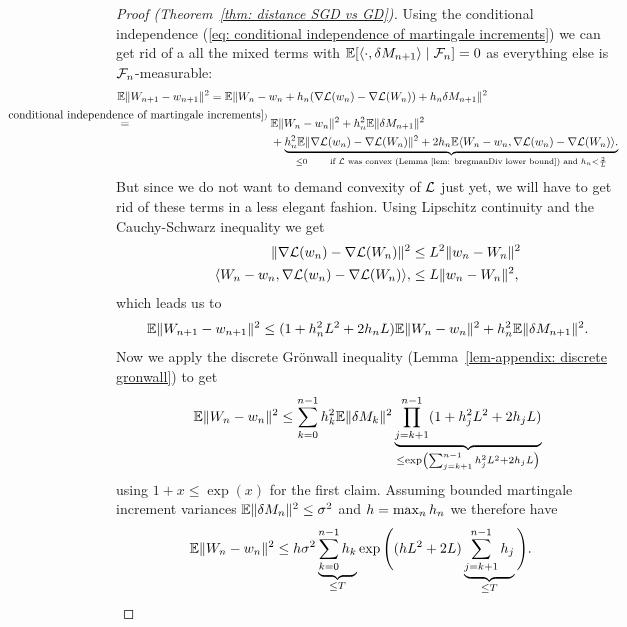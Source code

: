 \begin{proof}[Proof (Theorem~\ref{thm: distance SGD vs GD})]
	Using the conditional independence (\ref{eq: conditional independence of martingale increments})
	we can get rid of a all the mixed terms with
	\(\mathbb{E}[\langle \cdot, \delta M_{n+1}\rangle\mid\mathcal{F}_n]=0\) as everything
	else is \(\mathcal{F}_n\)-measurable:
	\begin{align*}
		&\E\|\Weights_{n+1}-\weights_{n+1}\|^2
		= \E\|\Weights_n - \weights_n
		+ \lr_n(\nabla\Loss(\weights_n)-\nabla\Loss(\Weights_n))
		+ \lr_n\martIncr_{n+1}\|^2\\
		&\lxeq{(\ref{eq: conditional independence of martingale increments})}
		\begin{aligned}[t]
			&\E\|\Weights_n-\weights_n\|^2 + \lr_n^2\E\|\martIncr_{n+1}\|^2\\
			&+\underbrace{
				\lr_n^2\E\|\nabla\Loss(\weights_n)-\nabla\Loss(\Weights_n)\|^2
				+ 2\lr_n\E\langle\Weights_n-\weights_n,
				\nabla\Loss(\weights_n)-\nabla\Loss(\Weights_n)\rangle.
			}_{
				\le 0 \qquad
				\text{if \(\Loss\) was convex (Lemma~\ref{lem: bregmanDiv lower bound}) and }
				\lr_n<\frac2\ubound
			}
		\end{aligned}
	\end{align*}
	But since we do not want to demand convexity of \(\mathcal{L}\) just yet, we will
	have to get rid of these terms in a less elegant fashion. Using Lipschitz
	continuity and the Cauchy-Schwarz inequality we get
	\begin{align*}
		\|\nabla\mathcal{L}(w_n)-\nabla\mathcal{L}(W_n)\|^2
		&\le L^2\|w_n-W_n\|^2\\
		\langle W_n-w_n,
		\nabla\mathcal{L}(w_n)-\nabla\mathcal{L}(W_n)\rangle,
		&\le L \|w_n-W_n\|^2,
	\end{align*}
	which leads us to
	\begin{align*}
		\mathbb{E}\|W_{n+1}-w_{n+1}\|^2
		\le (1+h_n^2L^2 + 2h_nL)\mathbb{E}\|W_n-w_n\|^2
		+ h_n^2\mathbb{E}\|\delta M_{n+1}\|^2.
	\end{align*}
	Now we apply the discrete Gr\"onwall inequality (Lemma~\ref{lem-appendix:
	discrete gronwall}) to get
	\begin{align*}
		\mathbb{E}\|W_n-w_n\|^2
		\le \sum_{k=0}^{n-1}h_k^2\mathbb{E}\|\delta M_k\|^2
		\underbrace{
			\prod_{j=k+1}^{n-1}(1+h_j^2L^2 + 2h_jL)
		}_{
			\le \exp\left(\sum_{j=k+1}^{n-1}h_j^2L^2 + 2h_jL\right)
		}
	\end{align*}
	using \(1+x\le\exp(x)\) for the first claim. Assuming bounded martingale
	increment variances \(\mathbb{E}\|\delta M_n\|^2\le\sigma^2\) and \(h=\max_nh_n\)
	we therefore have 
	\begin{align*}
		\mathbb{E}\|W_n-w_n\|^2
		&\le h\sigma^2\underbrace{\sum_{k=0}^{n-1}h_k}_{\le T}
		\exp\Bigg((hL^2+2L)\underbrace{\sum_{j=k+1}^{n-1}h_j}_{\le T}\Bigg).
		\qedhere
	\end{align*}
\end{proof}

